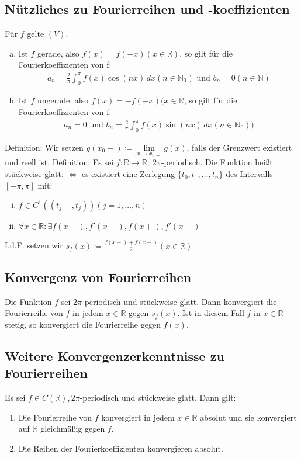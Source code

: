 \subsection{Nützliches zu Fourierreihen und -koeffizienten}
Für $f$ gelte $(V)$.
\begin{enumerate} [a)]
    \item Ist $f$ gerade, also $f(x) = f(-x) (x \in \mathbb{R})$, so gilt für die Fourierkoeffizienten von f:
    \begin{align*}
        a_n = \frac{2}{\pi} \int_0^{\pi} f(x) \cos(nx)\,dx (n \in \mathbb{N}_0) \text{ und } b_n=0 (n \in \mathbb{N})
    \end{align*}
    \item Ist $f$ ungerade, also $f(x) = -f(-x) (x \in \mathbb{R}$, so gilt für die Fourierkoeffizienten von f:
    \begin{align*}
        a_n = 0 \text{ und } b_n= \frac{2}{\pi} \int_0^{\pi} f(x) \sin(nx)\,dx (n \in \mathbb{N}_0))
    \end{align*}
\end{enumerate}
Definition: Wir setzen $g(x_0\pm) \coloneqq \lim \limits_{x \to x_0 \pm} g(x)$, falls der Grenzwert existiert und reell ist.
Definition: Es sei $f:\mathbb{R} \to \mathbb{R} \text{ } 2\pi$-periodisch. Die Funktion heißt \underline{stückweise glatt}: $\Leftrightarrow$ es existiert eine
Zerlegung $\{t_0,t_1,\ldots,t_n\}$ des Intervalls $[-\pi,\pi]$ mit:
\begin{enumerate}[i)]
    \item $f \in C^1((t_{j-1},t_j)) (j=1,\ldots,n)$
    \item $\forall x \in \mathbb{R}: \exists f(x-),f'(x-),f(x+),f'(x+)$
\end{enumerate}
I.d.F. setzen wir $s_f(x) \coloneqq \frac{f(x+) + f(x-)}{2} (x \in \mathbb{R})$

\subsection{Konvergenz von Fourierreihen}
Die Funktion $f$ sei $2\pi$-periodisch und stückweise glatt. Dann konvergiert die Fourierreihe von $f$ in jedem $x \in \mathbb{R}$ gegen $s_f(x)$. Ist in diesem
Fall $f$ in $x \in \mathbb{R}$ stetig, so konvergiert die Fourierreihe gegen $f(x)$.

\subsection{Weitere Konvergenzerkenntnisse zu Fourierreihen}
Es sei $f \in C(\mathbb{R}), 2\pi$-periodisch und stückweise glatt. Dann gilt:
\begin{enumerate}
    \item Die Fourierreihe von $f$ konvergiert in jedem $x \in \mathbb{R}$ absolut und sie konvergiert auf $\mathbb{R}$ gleichmäßig gegen $f$.
    \item Die Reihen der Fourierkoeffizienten konvergieren absolut.
\end{enumerate}